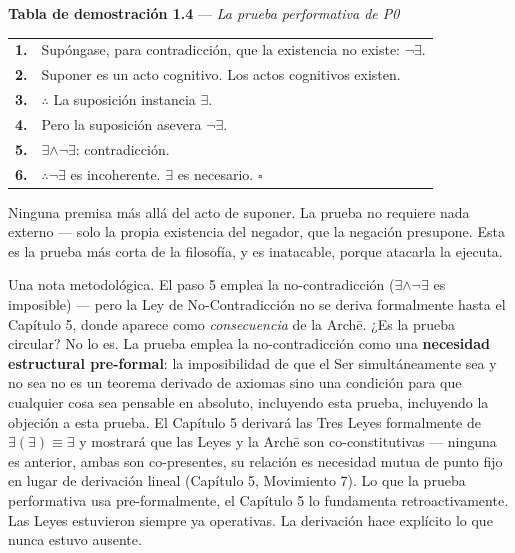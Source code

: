\documentclass[10pt, openany, oneside]{book}
\begin{document}
\textbf{Tabla de demostración 1.4} --- \textit{La prueba performativa de P0}

\vspace{0.5em}

\noindent\begin{tabular}{r p{}}
\textbf{1.} & Supóngase, para contradicción, que la existencia no existe: $\neg\exists$. \\[0.3em]
\textbf{2.} & Suponer es un acto cognitivo. Los actos cognitivos existen. \\[0.3em]
\textbf{3.} & $\therefore$ La suposición instancia $\exists$. \\[0.3em]
\textbf{4.} & Pero la suposición asevera $\neg\exists$. \\[0.3em]
\textbf{5.} & $\exists \wedge \neg\exists$: contradicción. \\[0.3em]
\textbf{6.} & $\therefore \neg\exists$ es incoherente. $\exists$ es necesario. $\square$ \\[0.3em]
\end{tabular}

\vspace{0.8em}

\noindent Ninguna premisa más allá del acto de suponer. La prueba no requiere nada externo --- solo la propia existencia del negador, que la negación presupone. Esta es la prueba más corta de la filosofía, y es inatacable, porque atacarla la ejecuta.

Una nota metodológica. El paso 5 emplea la no-contradicción ($\exists \wedge \neg\exists$ es imposible) --- pero la Ley de No-Contradicción no se deriva formalmente hasta el Capítulo 5, donde aparece como \textit{consecuencia} de la Arch\={e}. ¿Es la prueba circular? No lo es. La prueba emplea la no-contradicción como una \textbf{necesidad estructural pre-formal}: la imposibilidad de que el Ser simultáneamente sea y no sea no es un teorema derivado de axiomas sino una condición para que cualquier cosa sea pensable en absoluto, incluyendo esta prueba, incluyendo la objeción a esta prueba. El Capítulo 5 derivará las Tres Leyes formalmente de $\exists(\exists) \equiv \exists$ y mostrará que las Leyes y la Arch\={e} son co-constitutivas --- ninguna es anterior, ambas son co-presentes, su relación es necesidad mutua de punto fijo en lugar de derivación lineal (Capítulo 5, Movimiento 7). Lo que la prueba performativa usa pre-formalmente, el Capítulo 5 lo fundamenta retroactivamente. Las Leyes estuvieron siempre ya operativas. La derivación hace explícito lo que nunca estuvo ausente.
\end{document}
